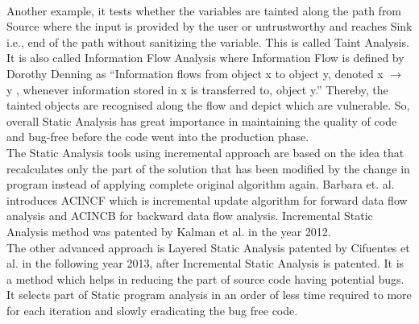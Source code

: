  \\

Another example, it tests whether the variables are tainted along the path from Source where the input is provided by the user or untrustworthy and reaches Sink i.e., end of the path without sanitizing the variable. This is called Taint Analysis. It is also called Information Flow Analysis where Information Flow is defined by Dorothy Denning \cite{Denning} as “Information flows from object x to object y, denoted x $\rightarrow$ y , whenever information stored in x is transferred to, object y.” Thereby, the tainted objects are recognised along the flow and depict which are vulnerable. So, overall Static Analysis has great importance in maintaining the quality of code and bug-free before the code went into the production phase. \\

The Static Analysis tools using incremental approach are based on the idea that recalculates only the part of the solution that has been modified by the change in program instead of applying complete original algorithm again. Barbara et. al. introduces ACINCF which is incremental update algorithm for forward data flow analysis and ACINCB for backward data flow analysis. Incremental Static Analysis method was patented by Kalman et al. in the year 2012. \\

The other advanced approach is Layered Static Analysis patented by Cifuentes et al. in the following year 2013, after Incremental Static Analysis is patented. It is a method which helps in reducing the part of source code having potential bugs. It selects part of Static program analysis in an order of less time required to more for each iteration and slowly eradicating the bug free code. \\

